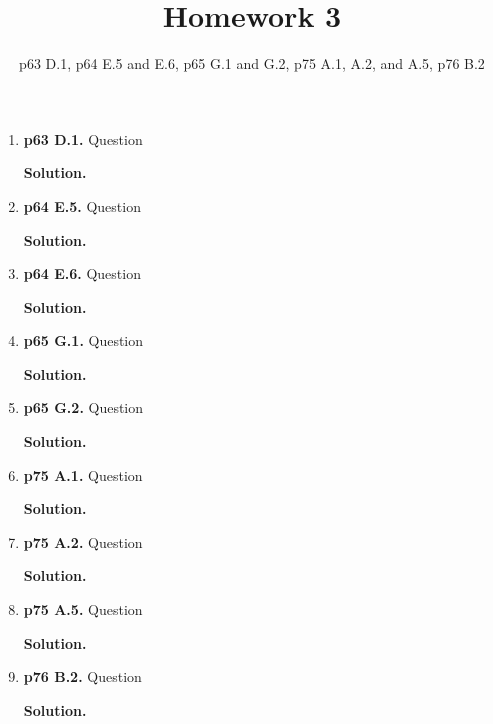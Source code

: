 \documentclass[11pt]{article}
\begin{document}
\title{Homework 3}
\date{p63 D.1, p64 E.5 and E.6, p65 G.1 and G.2, p75 A.1, A.2, and A.5, p76 B.2}
\maketitle

\thispagestyle{fancy}  
\pagestyle{fancy}      

\begin{enumerate}

\item {\bfseries p63 D.1.} Question
  
  {\bfseries Solution.}

\item {\bfseries p64 E.5.} Question
  
  {\bfseries Solution.}

\item {\bfseries p64 E.6.} Question
  
  {\bfseries Solution.}
  
\newpage

\item {\bfseries p65 G.1.} Question
  
  {\bfseries Solution.}

\item {\bfseries p65 G.2.} Question
  
  {\bfseries Solution.}
  
\newpage

\item {\bfseries p75 A.1.} Question
  
  {\bfseries Solution.}

\item {\bfseries p75 A.2.} Question
  
  {\bfseries Solution.}

\item {\bfseries p75 A.5.} Question
  
  {\bfseries Solution.}
  
\newpage

\item {\bfseries p76 B.2.} Question
  
  {\bfseries Solution.}

\end{enumerate}
\end{document}
